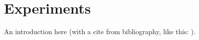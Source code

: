 \section{Experiments}

An introduction here (with a cite from bibliography, like this: \cite{greenwade93}).
